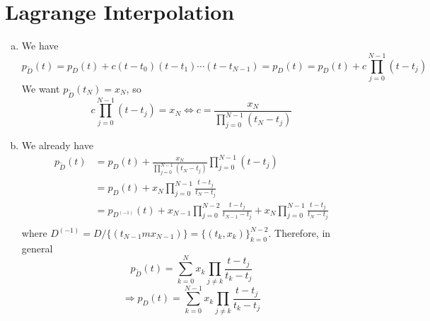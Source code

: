 \section{Lagrange Interpolation}\label{sec:p2}

\begin{enumerate}[(a)]
\item We have 
\[p_{\tilde{D}}(t) = p_D(t) + c(t-t_0)(t-t_1)\cdots(t-t_{N-1}) = p_D(t) = p_D(t) + c\prod_{j=0}^{N-1}(t-t_j)\]
We want $p_{\tilde{D}}(t_N) = x_N$, so
\[c\prod_{j=0}^{N-1}(t-t_j) = x_N \Leftrightarrow c = \frac{x_N}{\prod_{j=0}^{N-1}(t_N-t_j)}\]

\item We already have
\begin{align*}
	p_{\tilde{D}}(t)
	&= p_D(t) + \frac{x_N}{\prod_{j=0}^{N-1}(t_N-t_j)} \prod_{j=0}^{N-1}(t-t_j) \\
	&= p_D(t) + x_N \prod_{j=0}^{N-1}\frac{t-t_j}{t_N-t_j} \\
	&= p_{D^{(-1)}}(t) + x_{N-1} \prod_{j=0}^{N-2}\frac{t-t_j}{t_{N-1}-t_j} + x_N \prod_{j=0}^{N-1}\frac{t-t_j}{t_N-t_j} \\
\end{align*}
where $D^{(-1)} = D / \{(t_{N-1}m x_{N-1})\} = \{(t_k,x_k)\}_{k=0}^{N-2}$. Therefore, in general
\[p_{\tilde{D}}(t) = \sum_{k=0}^{N}x_k \prod_{j \neq k}\frac{t-t_j}{t_k-t_j}  \]
\[\Rightarrow p_{D}(t) = \sum_{k=0}^{N-1}x_k \prod_{j \neq k}\frac{t-t_j}{t_k-t_j}\]

\end{enumerate}